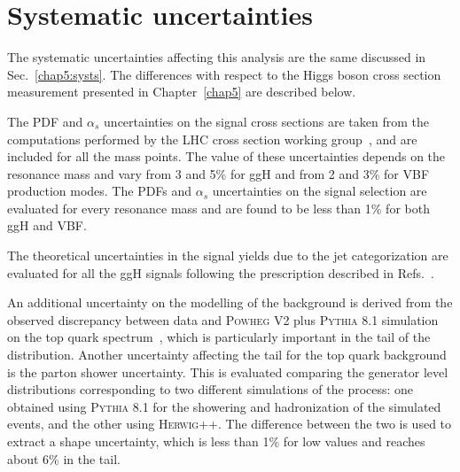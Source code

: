 \section{Systematic uncertainties}\label{chap6:Systematics}

The systematic uncertainties affecting this analysis are the same discussed in Sec.~\ref{chap5:systs}. The differences with respect to the Higgs boson cross section measurement presented in Chapter~\ref{chap5} are described below.

The PDF and $\alpha_s$ uncertainties on the signal cross sections are taken from the computations performed by the LHC cross section working group~\cite{YRtmp}, and are included for all the mass points. The value of these uncertainties depends on the resonance mass and vary from 3 and 5\% for ggH and from 2 and 3\% for VBF production modes. The PDFs and $\alpha_{s}$ uncertainties on the signal selection are evaluated for every resonance mass and are found to be less than 1\% for both ggH and VBF.

The theoretical uncertainties in the signal yields due to the jet categorization are evaluated for all the ggH signals following the prescription described in Refs.~\cite{Stewart:2011cf,Heinemeyer:2013tqa}.

An additional uncertainty on the modelling of the \ttbar background is derived from the observed discrepancy between data and \textsc{Powheg V2} plus \textsc{Pythia 8.1} simulation on the top quark \pt spectrum~\cite{Khachatryan:2015oqa}, which is particularly important in the tail of the \mti distribution. Another uncertainty affecting the \mti tail for the top quark background is the parton shower uncertainty. This is evaluated comparing the generator level \mti distributions corresponding to two different simulations of the \ttbar process: one obtained using \textsc{Pythia 8.1} for the showering and hadronization of the simulated events, and the other using \textsc{Herwig++}. The difference between the two is used to extract a shape uncertainty, which is less than 1\% for low \mti values and reaches about 6\% in the \mti tail.






